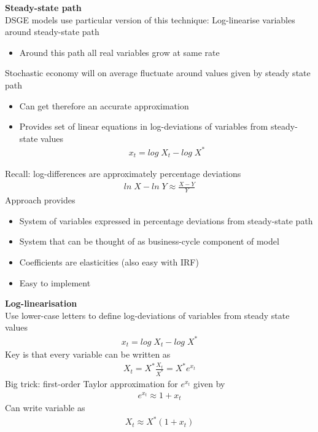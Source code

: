 \documentclass{beamer}
\begin{document}
\begin{frame}
  \textbf{Steady-state path}\\
  DSGE models use particular version of this technique: Log-linearise  variables around steady-state path
  \begin{itemize}
    \item Around this path all real variables grow at same rate
  \end{itemize}
  \medskip
  Stochastic economy will on average fluctuate around values given by steady state path
  \begin{itemize}
    \item Can get therefore an accurate approximation
    \item Provides set of linear equations in log-deviations of variables from steady-state values
    \begin{align*}
      x_t=log\; X_t - log\; X^*
    \end{align*}
  \end{itemize}
\end{frame}

\begin{frame}
 Recall: log-differences are approximately percentage deviations
 \begin{align*}
   ln\;X-ln\; Y \approx \frac{X-Y}{Y} 
 \end{align*}
 \medskip
 Approach provides
 \begin{itemize}
   \item System of variables expressed in percentage deviations from steady-state path
   \item System that can be thought of as business-cycle component of model
   \item Coefficients are elasticities (also easy with IRF)
   \item Easy to implement
 \end{itemize}
\end{frame}
\begin{frame}
 \textbf{Log-linearisation}\\
 Use lower-case letters to define log-deviations of variables from steady state values
 \begin{align}
   x_t=log\; X_t - log\; X^*
 \end{align}
 \medskip
 Key is that every variable can be written as
 \begin{align}
   X_t=X^*\frac{X_t}{X^*}=X^* e^{x_t} 
 \end{align}
 Big trick: first-order Taylor approximation for $e^{x_t}$ given by
\begin{align}
  e^{x_t}\approx1+x_t
\end{align}
 Can write variable as
\begin{align}
  X_t \approx X^*(1+x_t)
\end{align}
\end{frame}
\end{document}
